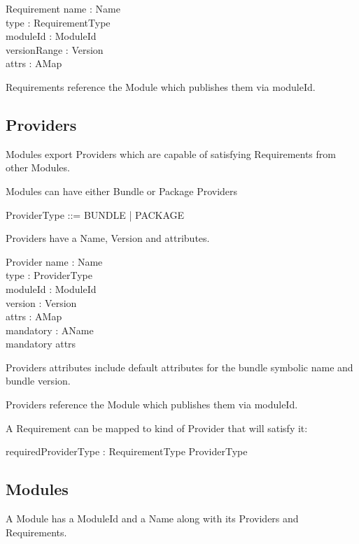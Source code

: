 \documentclass[a4paper,9pt]{article}
\begin{document}
\begin{schema}{Requirement}
 name : Name \\
 type : RequirementType \\
 moduleId : ModuleId \\
 versionRange : \power Version \\
 attrs : AMap \\
\end{schema}

Requirements reference the Module which publishes them via moduleId.

\subsection*{Providers}

Modules export Providers which are capable of satisfying Requirements from other Modules.

Modules can have either Bundle or Package Providers
\begin{zed}
 ProviderType ::= BUNDLE | PACKAGE
\end{zed}

Providers have a Name, Version and attributes.

\begin{schema}{Provider}
name : Name \\
type : ProviderType \\
moduleId : ModuleId \\
version : Version \\
attrs : AMap \\
mandatory : \power AName \\
\where
mandatory \subseteq \dom attrs \\
\end{schema}

Providers attributes include default attributes for the bundle symbolic name and bundle version.

Providers reference the Module which publishes them via moduleId.

A Requirement can be mapped to kind of Provider that will satisfy it:

\begin{axdef}
 requiredProviderType : RequirementType \fun ProviderType
\end{axdef}

\subsection*{Modules}
A Module has a ModuleId and a Name along with its Providers and Requirements.
\end{document}
